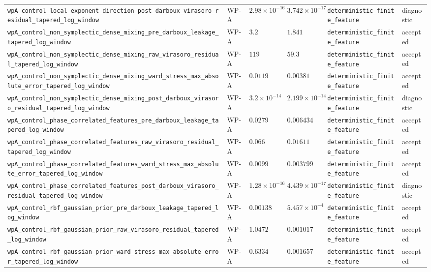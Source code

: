 \begin{table}[t]
\begin{tabular}{@{}llllll@{}}
\texttt{wpA\_control\_local\_exponent\_direction\_post\_darboux\_virasoro\_residual\_tapered\_log\_window} & WP-A & $2.98\times10^{-16}$ & $3.742\times10^{-17}$ & \texttt{deterministic\_finite\_feature} & diagnostic \\
\texttt{wpA\_control\_non\_symplectic\_dense\_mixing\_pre\_darboux\_leakage\_tapered\_log\_window} & WP-A & $3.2$ & $1.841$ & \texttt{deterministic\_finite\_feature} & accepted \\
\texttt{wpA\_control\_non\_symplectic\_dense\_mixing\_raw\_virasoro\_residual\_tapered\_log\_window} & WP-A & $119$ & $59.3$ & \texttt{deterministic\_finite\_feature} & accepted \\
\texttt{wpA\_control\_non\_symplectic\_dense\_mixing\_ward\_stress\_max\_absolute\_error\_tapered\_log\_window} & WP-A & $0.0119$ & $0.00381$ & \texttt{deterministic\_finite\_feature} & accepted \\
\texttt{wpA\_control\_non\_symplectic\_dense\_mixing\_post\_darboux\_virasoro\_residual\_tapered\_log\_window} & WP-A & $3.2\times10^{-14}$ & $2.199\times10^{-14}$ & \texttt{deterministic\_finite\_feature} & diagnostic \\
\texttt{wpA\_control\_phase\_correlated\_features\_pre\_darboux\_leakage\_tapered\_log\_window} & WP-A & $0.0279$ & $0.006434$ & \texttt{deterministic\_finite\_feature} & accepted \\
\texttt{wpA\_control\_phase\_correlated\_features\_raw\_virasoro\_residual\_tapered\_log\_window} & WP-A & $0.066$ & $0.01611$ & \texttt{deterministic\_finite\_feature} & accepted \\
\texttt{wpA\_control\_phase\_correlated\_features\_ward\_stress\_max\_absolute\_error\_tapered\_log\_window} & WP-A & $0.0099$ & $0.003799$ & \texttt{deterministic\_finite\_feature} & accepted \\
\texttt{wpA\_control\_phase\_correlated\_features\_post\_darboux\_virasoro\_residual\_tapered\_log\_window} & WP-A & $1.28\times10^{-16}$ & $4.439\times10^{-17}$ & \texttt{deterministic\_finite\_feature} & diagnostic \\
\texttt{wpA\_control\_rbf\_gaussian\_prior\_pre\_darboux\_leakage\_tapered\_log\_window} & WP-A & $0.00138$ & $5.457\times10^{-4}$ & \texttt{deterministic\_finite\_feature} & accepted \\
\texttt{wpA\_control\_rbf\_gaussian\_prior\_raw\_virasoro\_residual\_tapered\_log\_window} & WP-A & $1.0472$ & $0.001017$ & \texttt{deterministic\_finite\_feature} & accepted \\
\texttt{wpA\_control\_rbf\_gaussian\_prior\_ward\_stress\_max\_absolute\_error\_tapered\_log\_window} & WP-A & $0.6334$ & $0.001657$ & \texttt{deterministic\_finite\_feature} & accepted \\

\end{tabular}
\end{table}
